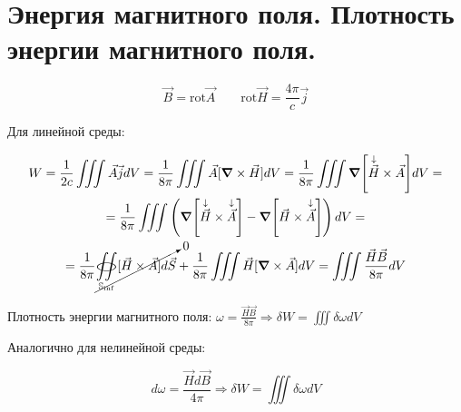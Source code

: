 \section{Энергия магнитного поля. Плотность энергии магнитного поля.}

\[
\vec{B}=\mathrm{rot}\vec{A} \qquad \mathrm{rot}\vec{H}=\frac{4\pi}{c}\vec{j}
\]

Для линейной среды:

\begin{gather*}
    W=\frac{1}{2c}\iiint \vec{A}\vec{j}dV=\frac{1}{8\pi}\iiint \vec{A}[\grad \times \vec{H}]dV=\frac{1}{8\pi}\iiint \grad[\overset{\downarrow}{\vec{H}}\times \vec{A}]dV= \\
    =\frac{1}{8\pi}\iiint \left( \grad[\overset{\downarrow}{\vec{H}}\times \overset{\downarrow}{\vec{A}}]-\grad [\vec{H}\times \overset{\downarrow}{\vec{A}}] \right)dV= \\
    =\frac{1}{8\pi} \cancelto{0}{\underset{\mathbb{S}_{\inf}}{\oiint}[\vec{H}\times \vec{A}]d\vec{S} }+\frac{1}{8\pi}\iiint\vec{H}[\grad \times \vec{A}]dV=\iiint \frac{\vec{H}\vec{B}}{8\pi}dV  
\end{gather*}

Плотность энергии магнитного поля: \( \omega= \frac{\vec{H}\vec{B}}{8\pi} \Rightarrow \delta W= \iiint \delta\omega dV \)

Аналогично для нелинейной среды:

\[
d\omega= \frac{\vec{H}d\vec{B}}{4\pi} \Rightarrow \delta W = \iiint \delta \omega dV
\]